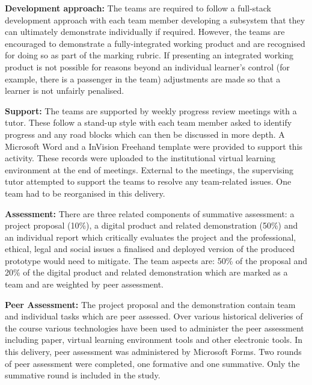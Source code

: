 \documentclass[sigconf, anonymous=false]{acmart}
\begin{document}
\textbf{Development approach:}
The teams are required to follow a full-stack development approach
with each team member developing a subsystem that they can ultimately
demonstrate individually if required. However, the teams are
encouraged to demonstrate a fully-integrated working product and are
recognised for doing so as part of the marking rubric. If presenting
an integrated working product is not possible for reasons beyond an
individual learner's control (for example, there is a passenger in the
team) adjustments are made so that a learner is not unfairly
penalised.

\textbf{Support:}
The teams are supported by weekly progress review meetings with a
tutor. These follow a stand-up style with each team member asked to
identify progress and any road blocks which can then be discussed in
more depth. A Microsoft Word and a InVision Freehand
template were provided to support this activity. These records were
uploaded to the institutional virtual learning environment at the end of
meetings. External to the meetings, the supervising tutor attempted to
support the teams to resolve any team-related issues. One team had to be reorganised in this delivery. 

\textbf{Assessment:}
There are three related components of summative assessment: a project
proposal (10\%), a digital product and related demonstration (50\%) and an individual report which critically evaluates the project and the professional, ethical, legal and social issues a finalised and deployed version of the
produced prototype would need to mitigate. The team aspects are: 50\%
of the proposal and 20\% of the digital product and related demonstration which are marked as a team and are weighted by peer assessment.

\textbf{Peer Assessment:}
The project proposal and the demonstration contain team and individual
tasks which are peer assessed. Over various historical deliveries of the
course various technologies have been used to administer the peer
assessment including paper, virtual learning environment tools and
other electronic tools. In this delivery, peer assessment was
administered by Microsoft Forms. Two rounds of peer assessment were
completed, one formative and one summative. Only the summative round
is included in the study.
\end{document}
